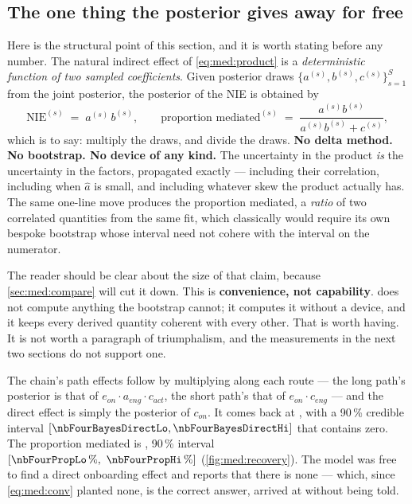 \subsection*{The one thing the posterior gives away for free}

Here is the structural point of this section, and it is worth stating before any number. The natural
indirect effect of \cref{eq:med:product} is a \emph{deterministic function of two sampled
coefficients}. Given posterior draws $\{a^{(s)}, b^{(s)}, c^{(s)}\}_{s=1}^{S}$ from the joint
posterior, the posterior of the NIE is obtained by
%
\begin{equation}
  \text{NIE}^{(s)} \;=\; a^{(s)}\, b^{(s)},
  \qquad
  \text{proportion mediated}^{(s)} \;=\; \frac{a^{(s)} b^{(s)}}{a^{(s)} b^{(s)} + c^{(s)}} ,
  \label{eq:med:derived}
\end{equation}
%
which is to say: multiply the draws, and divide the draws. \textbf{No delta method. No bootstrap. No
device of any kind.} The uncertainty in the product \emph{is} the uncertainty in the factors,
propagated exactly --- including their correlation, including when $\hat a$ is small, and including
whatever skew the product actually has. The same one-line move produces the proportion mediated, a
\emph{ratio} of two correlated quantities from the same fit, which classically would require its own
bespoke bootstrap whose interval need not cohere with the interval on the numerator.

The reader should be clear about the size of that claim, because \cref{sec:med:compare} will cut it
down. This is \textbf{convenience, not capability}.  does not compute anything
the bootstrap cannot; it computes it without a device, and it keeps every derived quantity coherent
with every other. That is worth having. It is not worth a paragraph of triumphalism, and the
measurements in the next two sections do not support one.

The chain's path effects follow by multiplying along each route --- the long path's posterior is that
of $e_{on} \cdot a_{eng} \cdot c_{act}$, the short path's that of $e_{on} \cdot c_{eng}$ --- and the
direct effect is simply the posterior of $c_{on}$. It comes back at \nbFourBayesDirect, with a
90\,\% credible interval $[\nbFourBayesDirectLo, \nbFourBayesDirectHi]$ that contains zero. The
proportion mediated is \pc{\nbFourPropMediated}, 90\,\% interval
$[\pc{\nbFourPropLo},\ \pc{\nbFourPropHi}]$ (\cref{fig:med:recovery}). The model was free to find a
direct onboarding effect and reports that there is none --- which, since \cref{eq:med:conv} planted
none, is the correct answer, arrived at without being told.


